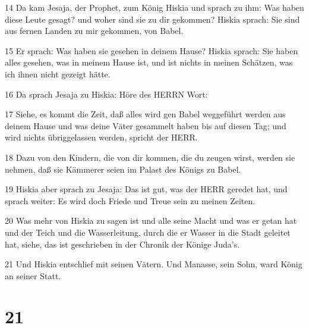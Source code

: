 \par 14 Da kam Jesaja, der Prophet, zum König Hiskia und sprach zu ihm: Was haben diese Leute gesagt? und woher sind sie zu dir gekommen? Hiskia sprach: Sie sind aus fernen Landen zu mir gekommen, von Babel.
\par 15 Er sprach: Was haben sie gesehen in deinem Hause? Hiskia sprach: Sie haben alles gesehen, was in meinem Hause ist, und ist nichts in meinen Schätzen, was ich ihnen nicht gezeigt hätte.
\par 16 Da sprach Jesaja zu Hiskia: Höre des HERRN Wort:
\par 17 Siehe, es kommt die Zeit, daß alles wird gen Babel weggeführt werden aus deinem Hause und was deine Väter gesammelt haben bis auf diesen Tag; und wird nichts übriggelassen werden, spricht der HERR.
\par 18 Dazu von den Kindern, die von dir kommen, die du zeugen wirst, werden sie nehmen, daß sie Kämmerer seien im Palast des Königs zu Babel.
\par 19 Hiskia aber sprach zu Jesaja: Das ist gut, was der HERR geredet hat, und sprach weiter: Es wird doch Friede und Treue sein zu meinen Zeiten.
\par 20 Was mehr von Hiskia zu sagen ist und alle seine Macht und was er getan hat und der Teich und die Wasserleitung, durch die er Wasser in die Stadt geleitet hat, siehe, das ist geschrieben in der Chronik der Könige Juda's.
\par 21 Und Hiskia entschlief mit seinen Vätern. Und Manasse, sein Sohn, ward König an seiner Statt.

\chapter{21}

